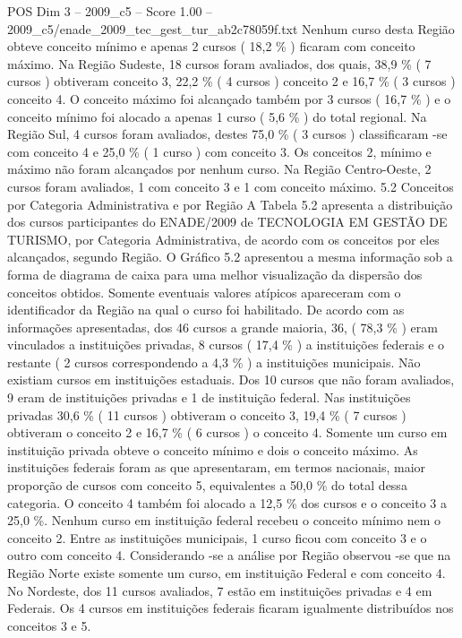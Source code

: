 \begin{textsample}{POS Dim 3 – 2009\_c5 – Score 1.00 – 2009\_c5/enade\_2009\_tec\_gest\_tur\_ab2c78059f.txt}
Nenhum curso desta Região obteve conceito mínimo e apenas 2 cursos ( 18,2 \% ) ficaram com conceito máximo.
Na Região Sudeste, 18 cursos foram avaliados, dos quais, 38,9 \% ( 7 cursos ) obtiveram conceito 3, 22,2 \% ( 4 cursos ) conceito 2 e 16,7 \% ( 3 cursos ) conceito 4.
O conceito máximo foi alcançado também por 3 cursos ( 16,7 \% ) e o conceito mínimo foi alocado a apenas 1 curso ( 5,6 \% ) do total regional.
Na Região Sul, 4 cursos foram avaliados, destes 75,0 \% ( 3 cursos ) classificaram -se com conceito 4 e 25,0 \% ( 1 curso ) com conceito 3.
Os conceitos 2, mínimo e máximo não foram alcançados por nenhum curso.
Na Região Centro-Oeste, 2 cursos foram avaliados, 1 com conceito 3 e 1 com conceito máximo. 5.2 Conceitos por Categoria Administrativa e por Região A Tabela 5.2 apresenta a distribuição dos cursos participantes do ENADE/2009 de TECNOLOGIA EM GESTÃO DE TURISMO, por Categoria Administrativa, de acordo com os conceitos por eles alcançados, segundo Região.
O Gráfico 5.2 apresentou a mesma informação sob a forma de diagrama de caixa para uma melhor visualização da dispersão dos conceitos obtidos.
Somente eventuais valores atípicos apareceram com o identificador da Região na qual o curso foi habilitado.
De acordo com as informações apresentadas, dos 46 cursos a grande maioria, 36, ( 78,3 \% ) eram vinculados a instituições privadas, 8 cursos ( 17,4 \% ) a instituições federais e o restante ( 2 cursos correspondendo a 4,3 \% ) a instituições municipais.
Não existiam cursos em instituições estaduais.
Dos 10 cursos que não foram avaliados, 9 eram de instituições privadas e 1 de instituição federal.
Nas instituições privadas 30,6 \% ( 11 cursos ) obtiveram o conceito 3, 19,4 \% ( 7 cursos ) obtiveram o conceito 2 e 16,7 \% ( 6 cursos ) o conceito 4.
Somente um curso em instituição privada obteve o conceito mínimo e dois o conceito máximo.
As instituições federais foram as que apresentaram, em termos nacionais, maior proporção de cursos com conceito 5, equivalentes a 50,0 \% do total dessa categoria.
O conceito 4 também foi alocado a 12,5 \% dos cursos e o conceito 3 a 25,0 \%.
Nenhum curso em instituição federal recebeu o conceito mínimo nem o conceito 2.
Entre as instituições municipais, 1 curso ficou com conceito 3 e o outro com conceito 4.
Considerando -se a análise por Região observou -se que na Região Norte existe somente um curso, em instituição Federal e com conceito 4.
No Nordeste, dos 11 cursos avaliados, 7 estão em instituições privadas e 4 em Federais.
Os 4 cursos em instituições federais ficaram igualmente distribuídos nos conceitos 3 e 5.

\end{textsample}
